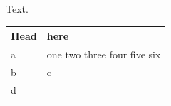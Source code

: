 \documentclass{article}
\begin{document}
\vspace*{170mm}
Text.

\begin{longtable}{lp{1cm}}
Head & here \\
\endhead
a & one two three four five six \\
b & c \\
d & \\
\end{longtable}
\end{document}
